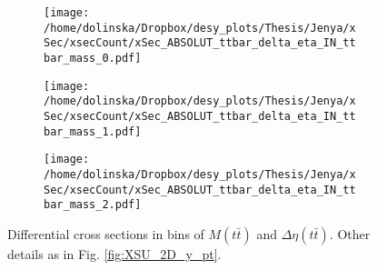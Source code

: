 \begin{figure}[p]
\centering
\begin{subfigure}
  \centering
  \texttt{[image: /home/dolinska/Dropbox/desy\_plots/Thesis/Jenya/xSec/xsecCount/xSec\_ABSOLUT\_ttbar\_delta\_eta\_IN\_ttbar\_mass\_0.pdf]}
\end{subfigure}
\begin{subfigure}
  \centering
  \texttt{[image: /home/dolinska/Dropbox/desy\_plots/Thesis/Jenya/xSec/xsecCount/xSec\_ABSOLUT\_ttbar\_delta\_eta\_IN\_ttbar\_mass\_1.pdf]}
\end{subfigure}
\begin{subfigure}
  \centering
  \texttt{[image: /home/dolinska/Dropbox/desy\_plots/Thesis/Jenya/xSec/xsecCount/xSec\_ABSOLUT\_ttbar\_delta\_eta\_IN\_ttbar\_mass\_2.pdf]}
\end{subfigure}
\caption{Differential cross sections in bins of $M(t\bar{t})$ and $\Delta\eta(t\bar{t})$. Other details as in Fig. \ref{fig:XSU_2D_y_pt}.}
\label{fig:XSU_2D_eta_Mtt}
\end{figure}

